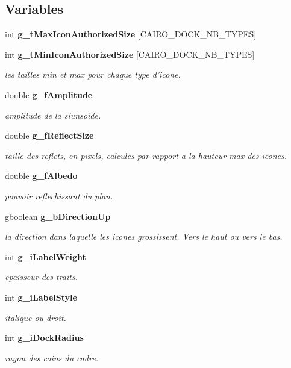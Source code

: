 \subsection*{Variables}
\begin{CompactItemize}
\item 
int {\bf g\_\-t\-Max\-Icon\-Authorized\-Size} [CAIRO\_\-DOCK\_\-NB\_\-TYPES]
\item 
int {\bf g\_\-t\-Min\-Icon\-Authorized\-Size} [CAIRO\_\-DOCK\_\-NB\_\-TYPES]
\begin{CompactList}\small\item\em les tailles min et max pour chaque type d'icone. \item\end{CompactList}\item 
double {\bf g\_\-f\-Amplitude}
\begin{CompactList}\small\item\em amplitude de la siunsoide. \item\end{CompactList}\item 
double {\bf g\_\-f\-Reflect\-Size}
\begin{CompactList}\small\item\em taille des reflets, en pixels, calcules par rapport a la hauteur max des icones. \item\end{CompactList}\item 
double {\bf g\_\-f\-Albedo}
\begin{CompactList}\small\item\em pouvoir reflechissant du plan. \item\end{CompactList}\item 
gboolean {\bf g\_\-b\-Direction\-Up}
\begin{CompactList}\small\item\em la direction dans laquelle les icones grossissent. Vers le haut ou vers le bas. \item\end{CompactList}\item 
int {\bf g\_\-i\-Label\-Weight}
\begin{CompactList}\small\item\em epaisseur des traits. \item\end{CompactList}\item 
int {\bf g\_\-i\-Label\-Style}
\begin{CompactList}\small\item\em italique ou droit. \item\end{CompactList}\item 
int {\bf g\_\-i\-Dock\-Radius}
\begin{CompactList}\small\item\em rayon des coins du cadre. \item\end{CompactList}\end{CompactItemize}


